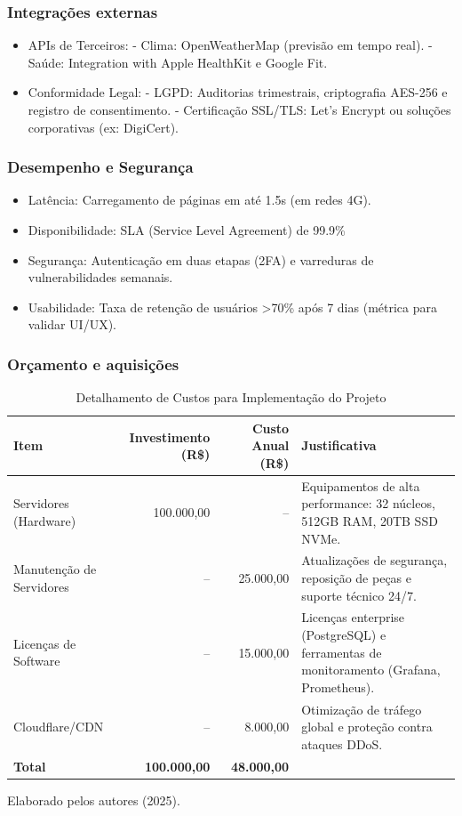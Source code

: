 \documentclass[a5paper, 12pt]{article}
\begin{document}
\subsubsection{Integrações externas}
\begin{itemize}[]
\item APIs de Terceiros:
- Clima: OpenWeatherMap (previsão em tempo real).
- Saúde: Integration with Apple HealthKit e Google Fit.
\item Conformidade Legal:
- LGPD: Auditorias trimestrais, criptografia AES-256 e registro de consentimento.
- Certificação SSL/TLS: Let's Encrypt ou soluções corporativas (ex: DigiCert).
\end{itemize}

\subsubsection*{Desempenho e Segurança}
\begin{itemize}[]
\item Latência: Carregamento de páginas em até 1.5s (em redes 4G).
\item Disponibilidade: SLA (Service Level Agreement) de 99.9\% 
\item Segurança: Autenticação em duas etapas (2FA) e varreduras de vulnerabilidades semanais.
\item Usabilidade: Taxa de retenção de usuários >70\% após 7 dias (métrica para validar UI/UX).
\end{itemize}

\subsubsection{Orçamento e aquisições}
\begin{table}[h]
\centering
\caption{Detalhamento de Custos para Implementação do Projeto}
\label{tab:custos}
\begin{tabular}{@{} >{\raggedright}p{2.5cm} r r p{3.5cm} @{}}
\toprule
\textbf{Item} & \textbf{Investimento (R\$)} & \textbf{Custo Anual (R\$)} & \textbf{Justificativa} \\
\midrule
Servidores (Hardware) & 100.000,00 & -- & Equipamentos de alta performance: 32 núcleos, 512GB RAM, 20TB SSD NVMe. \\
\addlinespace
Manutenção de Servidores & -- & 25.000,00 & Atualizações de segurança, reposição de peças e suporte técnico 24/7. \\
\addlinespace
Licenças de Software & -- & 15.000,00 & Licenças enterprise (PostgreSQL) e ferramentas de monitoramento (Grafana, Prometheus). \\
\addlinespace
Cloudflare/CDN & -- & 8.000,00 & Otimização de tráfego global e proteção contra ataques DDoS. \\
\bottomrule
\textbf{Total} & \textbf{100.000,00} & \textbf{48.000,00} & \\
\bottomrule
\end{tabular}

\smallskip
Elaborado pelos autores (2025).
\end{table}
\end{document}
